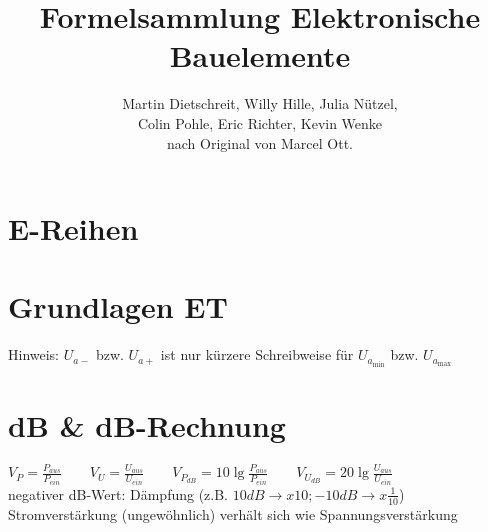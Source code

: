 

\newcommand*{\bfrac}[2]{\genfrac{}{}{0pt}{}{#1}{#2}}
\setlength{\extrarowheight}{2pt}


    \frontmatter
    \title{Formelsammlung Elektronische Bauelemente}
    \author{Martin Dietschreit, Willy Hille, Julia Nützel,\\Colin Pohle, Eric Richter, Kevin Wenke\\nach Original von Marcel Ott.}
    \maketitle
    \tableofcontents

    \mainmatter
    \section{E-Reihen}
    

    \section{Grundlagen ET}
    
    Hinweis: $U_{a-}$ bzw. $U_{a+}$ ist nur kürzere Schreibweise für $U_{a_{\min}}$ bzw. $U_{a_{\max}}$

    \section{dB \& dB-Rechnung} %
        $V_P=\frac{P_{aus}}{P_{ein}}\quad\quad V_U=\frac{U_{aus}}{U_{ein}}\quad\quad V_{P_{dB}}=10\lg\frac{P_{aus}}{P_{ein}}\quad\quad V_{U_{dB}}=20\lg\frac{U_{aus}}{U_{ein}}$ \\
    negativer dB-Wert: Dämpfung (z.B. $10dB\rightarrow x10; -10dB\rightarrow x\frac{1}{10}$)\\
    Stromverstärkung (ungewöhnlich) verhält sich wie Spannungsverstärkung\\

